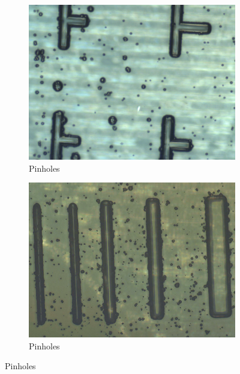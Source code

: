 \documentclass[final]{jyflluk}
\begin{document}
\renewcommand{\thesubfigure}{\arabic{subfigure}}

\begin{figure}[!h]
    \centering    
    \begin{subfigure}{0.48\textwidth}
        \centering
        \includegraphics[width=\linewidth]{optical/pinholes1.png} 
        \caption{Pinholes} \label{fig:pinhole1}
    \end{subfigure}
    \hfill
    \begin{subfigure}{0.48\textwidth}
        \centering
        \includegraphics[width=\linewidth]{optical/pinholes2.png} 
        \caption{Pinholes} \label{fig:pinhole2}
    \end{subfigure}
    

\end{figure}
\end{document}
